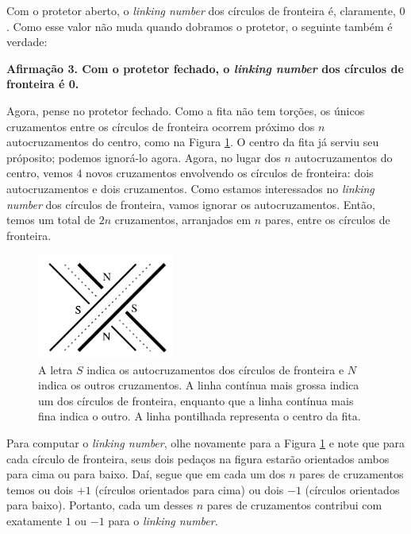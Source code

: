 	\par\vspace{0.3cm} Com o protetor aberto, o \textit{linking number} dos círculos de fronteira é, 
	claramente, $0$. Como esse valor não muda quando dobramos o protetor, o seguinte também é verdade:
	\begin{center}
		\textbf{Afirmação 3. Com o protetor fechado, o \textit{linking number} dos círculos de fronteira é 0.}
	\end{center}
	Agora, pense no protetor fechado. Como a fita não tem torções, os únicos 
	cruzamentos entre os círculos de fronteira ocorrem próximo dos $n$ autocruzamentos do centro, como 
	na Figura \ref{cruzamentos protetor}. O centro da fita já serviu seu próposito; podemos ignorá-lo agora.
	Agora, no lugar dos $n$ autocruzamentos do centro, vemos $4$ novos cruzamentos envolvendo os círculos 
	de fronteira: dois autocruzamentos e dois cruzamentos. Como estamos interessados no \textit{linking number} 
	dos círculos de fronteira, vamos ignorar os autocruzamentos. Então, temos um total de $2n$ cruzamentos,
	arranjados em $n$ pares, entre os círculos de fronteira.
	\begin{figure}[H]
		\begin{center}
			\includegraphics[width=4.5cm]{Images/protetor_fechado.png}
		\end{center}
		\caption{A letra $S$ indica os autocruzamentos dos círculos de fronteira e $N$ indica os outros
		cruzamentos. A linha contínua mais grossa indica um dos círculos de fronteira, enquanto que a linha
		contínua mais fina indica o outro. A linha pontilhada representa o centro da fita.}
		\label{cruzamentos protetor}
	\end{figure}
	Para computar o \textit{linking number}, olhe novamente para a 
	Figura \ref{cruzamentos protetor} e note que para cada círculo de fronteira, seus dois pedaços na figura
	estarão orientados ambos para cima ou para baixo. Daí, segue que em cada um dos $n$ pares de cruzamentos 
	temos ou dois $+1$ (círculos orientados para cima) ou dois $-1$ (círculos orientados para baixo). Portanto,
	cada um desses $n$ pares de cruzamentos contribui com exatamente $1$ ou $-1$ para o \textit{linking number}.
	
